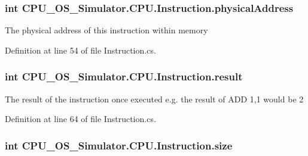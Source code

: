 \subsubsection[{physical\+Address}]{\setlength{\rightskip}{0pt plus 5cm}int C\+P\+U\+\_\+\+O\+S\+\_\+\+Simulator.\+C\+P\+U.\+Instruction.\+physical\+Address\hspace{0.3cm}{\ttfamily [private]}}\label{class_c_p_u___o_s___simulator_1_1_c_p_u_1_1_instruction_a401c8f3740b63632e17db6f80b505a17}


The physical address of this instruction within memory 



Definition at line 54 of file Instruction.\+cs.

\hypertarget{class_c_p_u___o_s___simulator_1_1_c_p_u_1_1_instruction_a80637c7fae4090f9c73f468dbd6af7ee}{}
\subsubsection[{result}]{\setlength{\rightskip}{0pt plus 5cm}int C\+P\+U\+\_\+\+O\+S\+\_\+\+Simulator.\+C\+P\+U.\+Instruction.\+result\hspace{0.3cm}{\ttfamily [private]}}\label{class_c_p_u___o_s___simulator_1_1_c_p_u_1_1_instruction_a80637c7fae4090f9c73f468dbd6af7ee}


The result of the instruction once executed e.\+g. the result of A\+D\+D 1,1 would be 2 



Definition at line 64 of file Instruction.\+cs.

\hypertarget{class_c_p_u___o_s___simulator_1_1_c_p_u_1_1_instruction_a8c533b0c08d8ac0a85b0e342f95cfeec}{}
\subsubsection[{size}]{\setlength{\rightskip}{0pt plus 5cm}int C\+P\+U\+\_\+\+O\+S\+\_\+\+Simulator.\+C\+P\+U.\+Instruction.\+size\hspace{0.3cm}{\ttfamily [private]}}\label{class_c_p_u___o_s___simulator_1_1_c_p_u_1_1_instruction_a8c533b0c08d8ac0a85b0e342f95cfeec}


